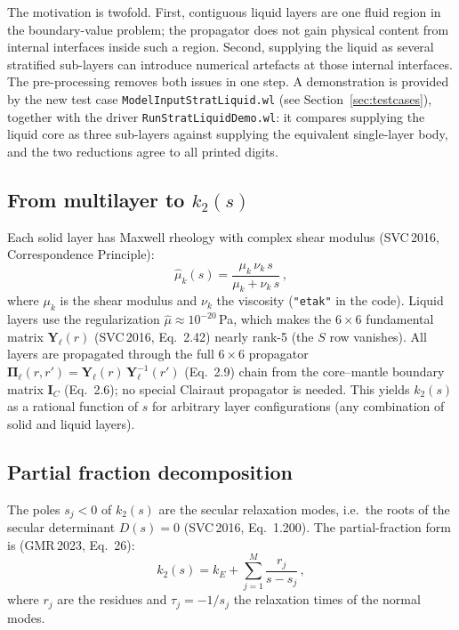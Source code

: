 \documentclass[11pt]{article}
\begin{document}
The motivation is twofold. First, contiguous liquid layers are one
fluid region in the boundary-value problem; the propagator does not
gain physical content from internal interfaces inside such a region.
Second, supplying the liquid as several stratified sub-layers can
introduce numerical artefacts at those internal interfaces. The
pre-processing removes both issues in one step. A demonstration is
provided by the new test case
\texttt{ModelInputStratLiquid.wl}
(see Section~\ref{sec:testcases}), together with the driver
\texttt{RunStratLiquidDemo.wl}: it compares supplying the liquid
core as three sub-layers against supplying the equivalent
single-layer body, and the two reductions agree to all printed
digits.

\subsection{From multilayer to $k_2(s)$}

Each solid layer has Maxwell rheology with complex shear modulus
(SVC\,2016, Correspondence Principle):
\begin{equation}
  \hat\mu_k(s) = \frac{\mu_k\,\nu_k\,s}{\mu_k + \nu_k\,s}\,,
\end{equation}
where $\mu_k$ is the shear modulus and $\nu_k$ the viscosity
(\texttt{"etak"} in the code).
Liquid layers use the regularization $\hat\mu \approx 10^{-20}$\,Pa,
which makes the $6\times6$ fundamental matrix $\mathbf{Y}_\ell(r)$
(SVC\,2016, Eq.~2.42) nearly rank-5 (the $S$ row vanishes).  All
layers are propagated through the full $6\times6$ propagator
$\mathbf{\Pi}_\ell(r, r') = \mathbf{Y}_\ell(r)\,
\mathbf{Y}_\ell^{-1}(r')$ (Eq.~2.9) chain from the core--mantle
boundary matrix $\mathbf{I}_C$ (Eq.~2.6); no special Clairaut
propagator is needed.  This yields $k_2(s)$ as a rational function
of $s$ for arbitrary layer configurations (any combination of solid
and liquid layers).

\subsection{Partial fraction decomposition}

The poles $s_j < 0$ of $k_2(s)$ are the secular relaxation modes, i.e.\
the roots of the secular determinant $D(s) = 0$ (SVC\,2016,
Eq.~1.200).  The partial-fraction form is (GMR\,2023, Eq.~26):
\begin{equation}
  k_2(s) = k_E + \sum_{j=1}^{M} \frac{r_j}{s - s_j}\,,
\end{equation}
where $r_j$ are the residues and $\tau_j = -1/s_j$ the relaxation
times of the normal modes.
\end{document}
